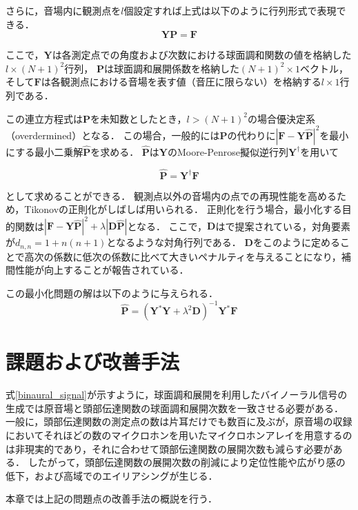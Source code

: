 \documentclass[a4paper]{jsarticle}
\begin{document}
さらに，音場内に観測点を$l$個設定すれば上式は以下のように行列形式で表現できる．
$$
    \mathbf{Y P}=\mathbf{F}
$$

ここで，$\mathbf{Y}$は各測定点での角度および次数における球面調和関数の値を格納した$l \times (N+1)^2$行列，
$\mathbf{P}$は球面調和展開係数を格納した$(N+1)^2 \times 1$ベクトル，
そして$\mathbf{F}$は各観測点における音場を表す値（音圧に限らない）を格納する$l \times 1$行列である．

この連立方程式は$\mathbf{P}$を未知数としたとき，$l > (N+1)^2$の場合優決定系（overdermined）となる．
この場合，一般的には$\mathbf{P}$の代わりに$|\mathbf{F} - \mathbf{Y}\hat{\mathbf{P}}|^2$を最小にする最小二乗解$\hat{\mathbf{P}}$を求める．
$\hat{\mathbf{P}}$は$\mathbf{Y}$のMoore-Penrose擬似逆行列$\mathbf{Y}^\dagger$を用いて

$$
    \hat{\boldsymbol{P}}=\boldsymbol{Y}^{\dagger} \boldsymbol{F}
$$

として求めることができる．
観測点以外の音場内の点での再現性能を高めるため，Tikonovの正則化がしばしば用いられる．
正則化を行う場合，最小化する目的関数は$|\boldsymbol{F}-\boldsymbol{Y} \hat{\boldsymbol{P}}|^{2}+\lambda|\boldsymbol{D} \hat{\boldsymbol{P}}|$となる．
ここで，$\mathbf{D}$は\cite{Duraiswaini2004-fy}で提案されている，対角要素が$d_{n, n} = 1 + n(n+1)$となるような対角行列である．
$\mathbf{D}$をこのように定めることで高次の係数に低次の係数に比べて大きいペナルティを与えることになり，補間性能が向上することが報告されている\cite{Duraiswaini2004-fy}．

この最小化問題の解は以下のように与えられる．
$$
    \hat{\boldsymbol{P}}=\left(\boldsymbol{Y}^{*} \boldsymbol{Y}+\lambda^{2} \boldsymbol{D}\right)^{-1} \boldsymbol{Y}^{*} \boldsymbol{F}
$$

\section{課題および改善手法}
式\ref{binaural_signal}が示すように，球面調和展開を利用したバイノーラル信号の生成では原音場と頭部伝達関数の球面調和展開次数を一致させる必要がある．
一般に，頭部伝達関数の測定点の数は片耳だけでも数百に及ぶが，原音場の収録においてそれほどの数のマイクロホンを用いたマイクロホンアレイを用意するのは非現実的であり，それに合わせて頭部伝達関数の展開次数も減らす必要がある．
したがって，頭部伝達関数の展開次数の削減により定位性能や広がり感の低下，および高域でのエイリアシングが生じる．

本章では上記の問題点の改善手法の概説を行う．



\end{document}
